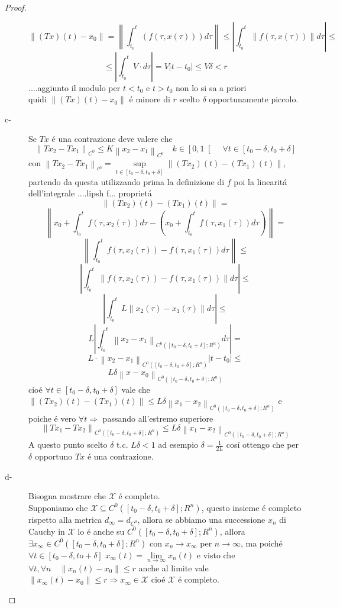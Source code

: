 \begin{proof}
\begin{description}
		$$\left\|(Tx)(t) - x_0 \right\| = \left\| \int_{t_0}^t(f(\tau,x(\tau)))d\tau \right\| \le \left|\int_{t_0}^t \left\| f(\tau,x(\tau)) \right\|d\tau \right|\le$$
		$$\le\left| \int_{t_0}^t V\cdot d\tau\right|=V\left| t-t_0\right|\le V\delta<r$$
		....aggiunto il modulo per $t<t_0$ e $t>t_0$ non lo si sa a priori\\
		quidi $\left\|(Tx)(t) - x_0 \right\|$ \'e minore di $r$ scelto $\delta$ opportunamente piccolo. 
		\item[c-] Se $Tx$ \'e una contrazione deve valere che
		$$\left\| Tx_2 - Tx_1\right\|_{C^0}\le K\left\|x_2-x_1\right\|_{C^0}\quad k\in\left[0,1\right[\quad\forall t\in\left[t_0-\delta,t_0+\delta\right]$$
		con $\left\|Tx_2-Tx_1\right\|_{c^0}=\sup\limits_{t\in\left[t_0-\delta,t_0+\delta\right]}\left\| (Tx_2)(t) - (Tx_1)(t)\right\|$, partendo da questa utilizzando prima la definizione di $f$ poi la linearit\'a dell'integrale ....lipsh f... propriet\'a
		$$\left\| (Tx_2)(t) - (Tx_1)(t)\right\|=$$
		$$\left\| x_0+\int_{t_0}^t f(\tau,x_2(\tau)) d\tau - \left(x_0+\int_{t_0}^t f(\tau,x_1(\tau)) d\tau\right) \right\|=$$
		$$\left\| \int_{t_0}^t f(\tau,x_2(\tau))-f(\tau,x_1(\tau)) d\tau \right\|\le$$
		$$\left| \int_{t_0}^t \left\|f(\tau,x_2(\tau))-f(\tau,x_1(\tau))\right\| d\tau \right|\le$$
		$$\left| \int_{t_0}^t L\left\|x_2(\tau)-x_1(\tau)\right\| d\tau \right|\le$$
		$$L\left| \int_{t_0}^t \left\|x_2-x_1\right\|_{C^0(\left[t_0-\delta,t_0+\delta\right];R^n)} d\tau \right|=$$
		$$L\cdot \left\| x_2-x_1 \right\|_{C^0(\left[t_0-\delta,t_0+\delta\right];R^n)}\left|t-t_0\right|\le$$
		$$L\delta\left\|x-x_0\right\|_{C^0(\left[t_0-\delta,t_0+\delta\right];R^n)}$$
		cio\'e $\forall t \in \left[t_0-\delta,t_0+\delta\right]$ vale che $\left\|(Tx_2)(t)-(Tx_1)(t)\right\|\le L\delta\left\|x_1-x_2\right\|_{C^0(\left[t_0-\delta,t_0+\delta\right];R^n)}$ e poiche \'e vero $\forall t \Rightarrow $ passando all'estremo superiore
		$$ \left\| Tx_1 - Tx_2 \right\|_{C^0(\left[t_0-\delta,t_0+\delta\right];R^n)}\le L\delta\left\|x_1-x_2\right\|_{C^0(\left[t_0-\delta,t_0+\delta\right];R^n)}$$
		A questo punto scelto $\delta$ t.c. $L\delta<1$ ad esempio $\delta=\frac{1}{2L}$ cos\'i ottengo che per $\delta$ opportuno $Tx$ \'e una contrazione.		
		\item[d-] Bisogna mostrare che $\mathcal{X}$ \'e completo.\\
		Supponiamo che $\mathcal{X}\subseteq C^0(\left[t_0-\delta,t_0+\delta\right];R^n)$, questo insieme \'e completo rispetto alla metrica $d_\infty=d_{C^0}$, allora se abbiamo una successione $x_n$ di Cauchy in $\mathcal{X}$ lo \'e anche su $C^0(\left[t_0-\delta,t_0+\delta\right];R^n)$, allora $\exists x_\infty\in C^0(\left[t_0-\delta,t_0+\delta\right];R^n)$ con $x_n\to x_\infty$ per $n\to\infty$, ma poich\'e $\forall t \in\left[t_0-\delta,to+\delta\right]$ $x_\infty(t)=\lim\limits_{n\to\infty}x_n(t)$ e visto che $\forall t,\forall n\quad \left\| x_n(t)-x_0\right\|\le r$ anche al limite vale $\left\| x_{\infty}(t)-x_0\right\|\le r \Rightarrow x_\infty\in\mathcal{X}$ cio\'e $\mathcal{X}$ \'e completo.

\end{description}
\end{proof}
